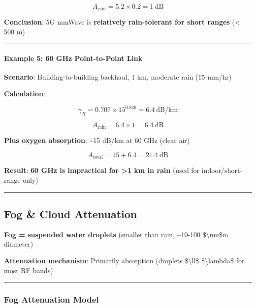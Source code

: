 \[
A_{\text{rain}} = 5.2 \times 0.2 = 1\ \text{dB}
\]

\textbf{Conclusion}: 5G mmWave is \textbf{relatively rain-tolerant for
short ranges} (\textless{} 500 m)

\begin{center}\rule{0.5\linewidth}{0.5pt}\end{center}

\paragraph{Example 5: 60 GHz Point-to-Point
Link}\label{example-5-60-ghz-point-to-point-link}

\textbf{Scenario}: Building-to-building backhaul, 1 km, moderate rain
(15 mm/hr)

\textbf{Calculation}:

\[
\gamma_R = 0.707 \times 15^{0.826} = 6.4\ \text{dB/km}
\]

\[
A_{\text{rain}} = 6.4 \times 1 = 6.4\ \text{dB}
\]

\textbf{Plus oxygen absorption}: \textasciitilde15 dB/km at 60 GHz
(clear air)

\[
A_{\text{total}} = 15 + 6.4 = 21.4\ \text{dB}
\]

\textbf{Result}: \textbf{60 GHz is impractical for \textgreater1 km in
rain} (used for indoor/short-range only)

\begin{center}\rule{0.5\linewidth}{0.5pt}\end{center}

\subsection{Fog \& Cloud Attenuation}\label{fog-cloud-attenuation}

\textbf{Fog = suspended water droplets} (smaller than rain,
\textasciitilde10-100 \$\textbackslash mu\$m diameter)

\textbf{Attenuation mechanism}: Primarily absorption (droplets
\$\textbackslash ll\$ \$\textbackslash lambda\$ for most RF bands)

\begin{center}\rule{0.5\linewidth}{0.5pt}\end{center}

\subsubsection{Fog Attenuation Model}\label{fog-attenuation-model}

